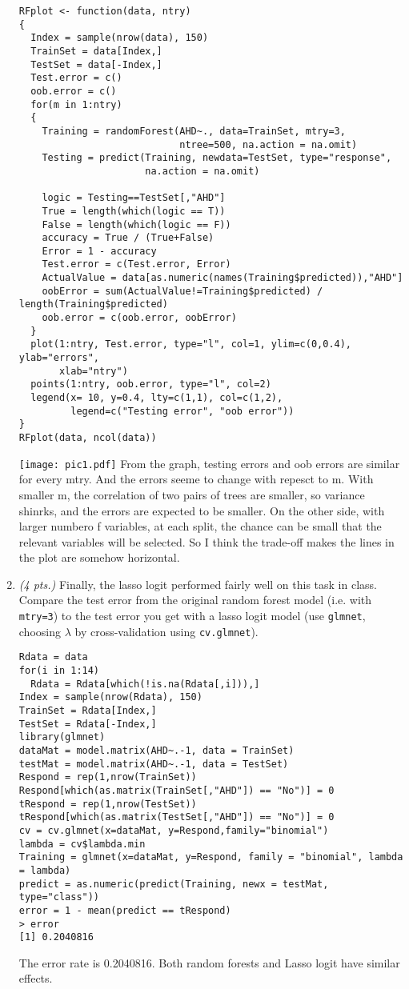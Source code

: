 \documentclass[11pt,english]{article}
\begin{document}
\begin{enumerate}
\begin{verbatim}
RFplot <- function(data, ntry)
{
  Index = sample(nrow(data), 150)
  TrainSet = data[Index,]
  TestSet = data[-Index,]
  Test.error = c()
  oob.error = c()
  for(m in 1:ntry)
  {
    Training = randomForest(AHD~., data=TrainSet, mtry=3,
                            ntree=500, na.action = na.omit)
    Testing = predict(Training, newdata=TestSet, type="response",
                      na.action = na.omit)

    logic = Testing==TestSet[,"AHD"]
    True = length(which(logic == T))
    False = length(which(logic == F))
    accuracy = True / (True+False)
    Error = 1 - accuracy
    Test.error = c(Test.error, Error)
    ActualValue = data[as.numeric(names(Training$predicted)),"AHD"]
    oobError = sum(ActualValue!=Training$predicted) / length(Training$predicted)
    oob.error = c(oob.error, oobError)
  }
  plot(1:ntry, Test.error, type="l", col=1, ylim=c(0,0.4), ylab="errors",
       xlab="ntry")
  points(1:ntry, oob.error, type="l", col=2)
  legend(x= 10, y=0.4, lty=c(1,1), col=c(1,2),
         legend=c("Testing error", "oob error"))
}
RFplot(data, ncol(data))
\end{verbatim}
\texttt{[image: pic1.pdf]}
From the graph, testing errors and oob errors are similar for every mtry.  And the errors seeme to change with repesct to m.  With smaller m, the correlation of two pairs of trees are smaller, so variance shinrks, and the errors are expected to be smaller.  On the other side, with larger numbero f variables, at each
split, the chance can be small that the relevant variables will be selected.  So I think the trade-off makes the lines in the plot are somehow horizontal.

\item \textit{(4 pts.)} Finally, the lasso logit performed fairly well on this task in class.  Compare the test error from the original random forest model (i.e. with \texttt{mtry=3}) to the test error you get with a lasso logit model (use \texttt{glmnet}, choosing $\lambda$ by cross-validation using \texttt{cv.glmnet}).
\begin{verbatim}
Rdata = data
for(i in 1:14)
  Rdata = Rdata[which(!is.na(Rdata[,i])),]
Index = sample(nrow(Rdata), 150)
TrainSet = Rdata[Index,]
TestSet = Rdata[-Index,]
library(glmnet)
dataMat = model.matrix(AHD~.-1, data = TrainSet)
testMat = model.matrix(AHD~.-1, data = TestSet)
Respond = rep(1,nrow(TrainSet))
Respond[which(as.matrix(TrainSet[,"AHD"]) == "No")] = 0
tRespond = rep(1,nrow(TestSet))
tRespond[which(as.matrix(TestSet[,"AHD"]) == "No")] = 0
cv = cv.glmnet(x=dataMat, y=Respond,family="binomial")
lambda = cv$lambda.min
Training = glmnet(x=dataMat, y=Respond, family = "binomial", lambda = lambda)
predict = as.numeric(predict(Training, newx = testMat, type="class"))
error = 1 - mean(predict == tRespond)
> error
[1] 0.2040816
\end{verbatim}
The error rate is 0.2040816.  Both random forests and Lasso logit have similar effects.


\end{enumerate}
\end{document}
